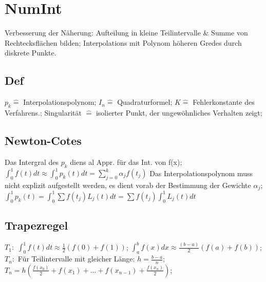 \section{NumInt}
Verbesserung der Näherung: Aufteilung in kleine Teilintervalle \& Summe von Rechtecksflächen bilden; Interpolations mit Polynom höheren Gredes durch diskrete Punkte.
\subsection{Def}
$ p_{k} \hat{=} $ Interpolationspolynom; 
$ I_{n} \hat{=} $ Quadraturformel; 
$ K \hat{=} $ Fehlerkonstante des Verfahrens.; 
Singularität $\hat{=}$ isolierter Punkt, der ungewöhnliches Verhalten zeigt; 

\subsection{Newton-Cotes}
Das Intergral des $ p_{k} $ diens al Appr. für das Int. von f(x); 
$ \int_{0}^{1} f(t) dt \approx \int_{0}^{1} p_{k} (t) dt =  \sum_{j=0}^{k} \alpha_j f( t_{j} ) $ Das Interpolationspolynom muss nicht explizit aufgestellt werden, es dient vorab der Bestimmung der Gewichte $ \alpha_{j} $; 
$ \int_{0}^{1} p_{k}(t) = \int_{0}^{1} \sum f( t_{j} ) L_{j} (t) dt = \sum f ( t_{j} ) \int_{0}^{1} L_{j} (t) dt $
\subsection{Trapezregel}
$ T_{1}: $ 
$ \int_{0}^{1} f (t) dt \approx \frac{1}{2} ( f(0) + f(1) ) $; 
$ \int_{a}^{b} f (x) dx \approx \frac{(b-a)}{2} (f(a) + f(b) ) $;\\
$ T_{n}: $
Für Teilintervalle mit gleicher Länge: $ h = \frac{b-a}{n} $;  
$ T_{n} = h (\frac{ f ( x_{0} ) }{2} + f(x_{1}) + ... + f(x_{n-1}) + \frac{ f(x_n) }{2} ) $; 
